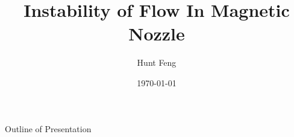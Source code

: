 \documentclass{beamer}
\title{Instability of Flow In Magnetic Nozzle}
\author{Hunt Feng}
\institute{University of Saskatchewan}
\date{\today}
\begin{document}
	\frame{\titlepage}
	\begin{frame}{Outline of Presentation}
		\tableofcontents
	\end{frame}

	
	
	
	
  
  \newpage
	
	 
\end{document}
